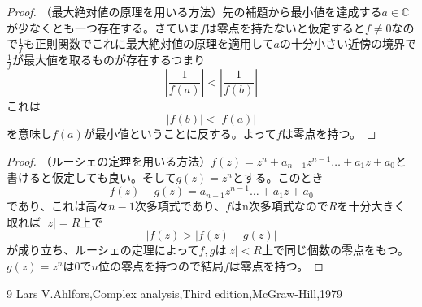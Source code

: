 \documentclass{jsarticle}
\newcommand{\cc}{\mathbb{C}}
\begin{document}
\begin{proof}（最大絶対値の原理を用いる方法）先の補題から最小値を達成する$a\in \cc$が少なくとも一つ存在する。さていま$f$は零点を持たないと仮定すると$f\neq 0$なので$\displaystyle \frac{1}{f}$も正則関数でこれに最大絶対値の原理を適用して$a$の十分小さい近傍の境界で$\displaystyle 
\frac{1}{f}$が最大値を取るものが存在するつまり
\[
\left|\frac{1}{f(a)}\right|<\left|\frac{1}{f(b)}\right|
\]
これは
\[
|f(b)|<|f(a)|
\]
を意味し$f(a)$が最小値ということに反する。よって$f$は零点を持つ。
\end{proof}

\begin{proof}（ルーシェの定理を用いる方法）$f(z)=z^n+a_{n-1}z^{n-1}\dots+a_1z+a_0$と書けると仮定しても良い。そして$g(z)=z^n$とする。このとき
\[
f(z)-g(z)=a_{n-1}z^{n-1}\dots+a_1z+a_0
\]
であり、これは高々$n-1$次多項式であり、$f$はn次多項式なので$R$を十分大きく取れば
$|z|=R$上で
\[
|f(z)>|f(z)-g(z)|
\]
が成り立ち、ルーシェの定理によって$f,g$は$|z|<R$上で同じ個数の零点をもつ。$g(z)=z^n$は$0$で$n$位の零点を持つので結局$f$は零点を持つ。
\end{proof}

\begin{thebibliography}{9}
Lars V.Ahlfors,Complex analysis,Third edition,McGraw-Hill,1979
\end{thebibliography}
\end{document}
